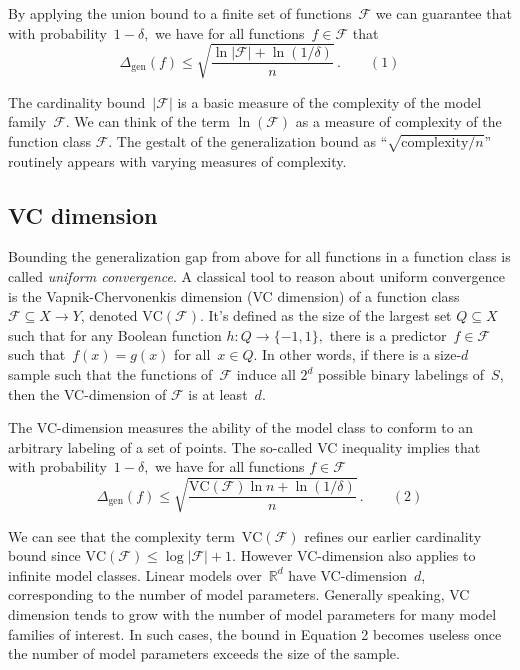 \documentclass{tufte-book}
\begin{document}
By applying the union bound to a finite set of functions~\(\mathcal{F}\)
we can guarantee that with probability~\(1-\delta,\) we have for all
functions~\(f\in\mathcal{F}\) that \[
\Delta_{\mathrm{gen}}(f)\le\sqrt{\frac{\ln|\mathcal{F}|+\ln(1/\delta)}{n}}\,.\quad\quad(1)
\]

The cardinality bound~\(|\mathcal{F}|\) is a basic measure of the
complexity of the model family~\(\mathcal{F}.\) We can think of the term
\(\ln(\mathcal{F})\) as a measure of complexity of the function class
\(\mathcal{F}\). The gestalt of the generalization bound as
``\(\sqrt{\mathrm{complexity}/n}\)'' routinely appears with varying
measures of complexity.

\hypertarget{vc-dimension}{%
\subsection{VC dimension}\label{vc-dimension}}


Bounding the generalization gap from above for all functions in a
function class is called \emph{uniform convergence}. A classical tool to
reason about uniform convergence is the Vapnik-Chervonenkis dimension
(VC dimension) of a function class
\(\mathcal{F}\subseteq X\rightarrow Y\), denoted
\(\mathrm{VC}(\mathcal{F})\). It's defined as the size of the largest
set \(Q\subseteq X\) such that for any Boolean function
\(h\colon Q \to \{-1,1\},\) there is a predictor~\(f\in\mathcal{F}\)
such that~\(f(x)= g(x)\) for all~\(x\in Q\). In other words, if there is
a size-\(d\) sample such that the functions of~\(\mathcal{F}\) induce
all \(2^d\) possible binary labelings of~\(S\), then the VC-dimension of
\(\mathcal{F}\) is at least~\(d\).

The VC-dimension measures the ability of the model class to conform to
an arbitrary labeling of a set of points. The so-called VC inequality
implies that with probability~\(1-\delta,\) we have for all functions
\(f\in\mathcal{F}\) \[
\Delta_{\mathrm{gen}}(f)\le \sqrt{\frac{\mathrm{VC}(\mathcal{F})\ln n+\ln(1/\delta)}{n}}\,.\quad\quad(2)
\]

We can see that the complexity term~\(\mathrm{VC}(\mathcal{F})\) refines
our earlier cardinality bound since
\(\mathrm{VC}(\mathcal{F})\le\log|\mathcal{F}|+1.\) However VC-dimension
also applies to infinite model classes. Linear models
over~\(\mathbb{R}^d\) have VC-dimension~\(d\), corresponding to the
number of model parameters. Generally speaking, VC dimension tends to
grow with the number of model parameters for many model families of
interest. In such cases, the bound in Equation 2 becomes useless once
the number of model parameters exceeds the size of the sample.
\end{document}
